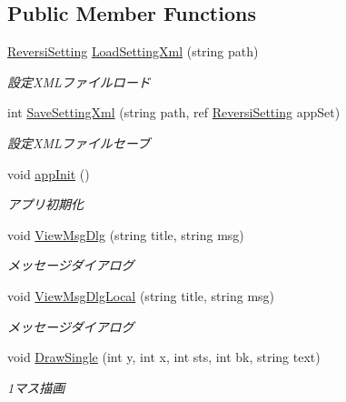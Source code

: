 \subsection*{Public Member Functions}
\begin{DoxyCompactItemize}
\item 
\hyperlink{class_reversi_form_1_1_reversi_setting}{Reversi\+Setting} \hyperlink{class_reversi_form_1_1_reversi_afbe64672e4a4c9e6f6404a3bbf2b5e1d}{Load\+Setting\+Xml} (string path)
\begin{DoxyCompactList}\small\item\em 設定\+X\+M\+Lファイルロード \end{DoxyCompactList}\item 
int \hyperlink{class_reversi_form_1_1_reversi_ac2c2df740914f062761a66f0bbde3f41}{Save\+Setting\+Xml} (string path, ref \hyperlink{class_reversi_form_1_1_reversi_setting}{Reversi\+Setting} app\+Set)
\begin{DoxyCompactList}\small\item\em 設定\+X\+M\+Lファイルセーブ \end{DoxyCompactList}\item 
void \hyperlink{class_reversi_form_1_1_reversi_aab2e35051cbff2f184ee7e76ae60846d}{app\+Init} ()
\begin{DoxyCompactList}\small\item\em アプリ初期化 \end{DoxyCompactList}\item 
void \hyperlink{class_reversi_form_1_1_reversi_af4efb5992bb28d48c4f585a7f6c7906f}{View\+Msg\+Dlg} (string title, string msg)
\begin{DoxyCompactList}\small\item\em メッセージダイアログ \end{DoxyCompactList}\item 
void \hyperlink{class_reversi_form_1_1_reversi_a5b1fd8f327358b4d0551af981b2a7f0c}{View\+Msg\+Dlg\+Local} (string title, string msg)
\begin{DoxyCompactList}\small\item\em メッセージダイアログ \end{DoxyCompactList}\item 
void \hyperlink{class_reversi_form_1_1_reversi_a21483fbe8309e9f6fa5d828fac98a96e}{Draw\+Single} (int y, int x, int sts, int bk, string text)
\begin{DoxyCompactList}\small\item\em 1マス描画 \end{DoxyCompactList}\item 

\end{DoxyCompactItemize}

